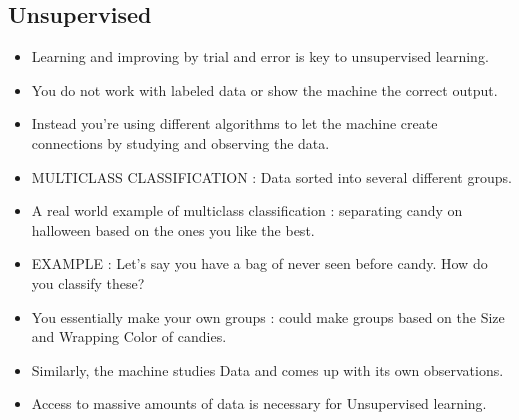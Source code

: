 \documentclass[11pt, oneside]{article}   	%
\begin{document}
\subsection{Unsupervised}
\begin{itemize}
\item Learning and improving by trial and error is key to unsupervised learning.
\item You do not work with labeled data or show the machine the correct output. 
\item Instead you're using different algorithms to let the machine create connections by studying and observing the data.
\item MULTICLASS CLASSIFICATION : Data sorted into several different groups. 
\item A real world example of multiclass classification : separating candy on halloween based on the ones you like the best.
\item EXAMPLE : Let's say you have a bag of never seen before candy. How do you classify these? 
\item You essentially make your own groups : could make groups based on the Size and Wrapping Color of candies. 
\item Similarly, the machine studies Data and comes up with its own observations.
\item Access to massive amounts of data is necessary for Unsupervised learning.
\end{itemize}
\end{document}
